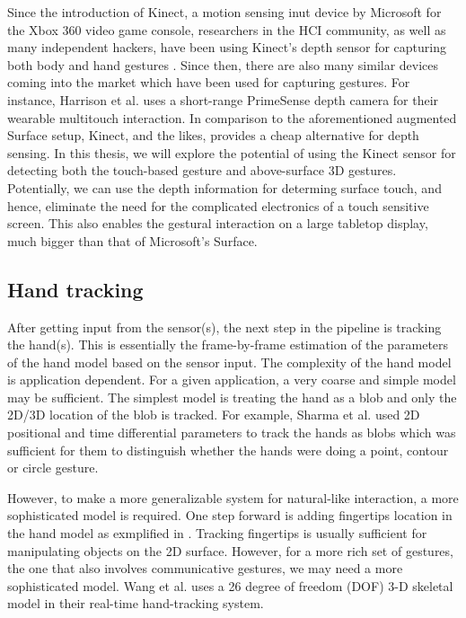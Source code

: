 Since the introduction of Kinect, a motion sensing inut device by Microsoft for
the Xbox 360 video game console, researchers in the HCI community, as well as
many independent hackers, have been using Kinect's depth sensor for capturing
both body and hand gestures \cite{openni}. Since then, there are also many
similar devices coming into the market which have been used for capturing
gestures. For instance, Harrison et al. \cite{harrison11} uses  a short-range
PrimeSense \cite{primesense} depth camera for their wearable multitouch
interaction. In comparison to the aforementioned augmented Surface setup,
Kinect, and the likes, provides a cheap alternative for depth sensing. In this
thesis, we will explore the potential of using the Kinect sensor for detecting 
both the touch-based gesture and above-surface 3D gestures. Potentially, we can 
use the depth information for determing surface touch, and hence, eliminate the 
need for the complicated electronics of a touch sensitive screen. This also 
enables the gestural interaction on a large tabletop display, much bigger than 
that of Microsoft's Surface.

\subsection{Hand tracking}
After getting input from the sensor(s), the next step in the pipeline is
tracking the hand(s). This is essentially the frame-by-frame estimation of the
parameters of the hand model based on the sensor input. The complexity of the
hand model is application dependent. For a given application, a very coarse and
simple model may be sufficient. The simplest model is treating the hand as a
blob and only the 2D/3D location of the blob is tracked. For example, Sharma et
al. \cite{sharma00} used 2D positional and time differential parameters to track
the hands as blobs which was sufficient for them to distinguish whether the
hands were doing a point, contour or circle gesture.

However, to make a more generalizable system for natural-like interaction, a
more sophisticated model is required. One step forward is adding fingertips
location in the hand model as exmplified in \cite{Oka02} \cite{harrison11}
\cite{larson11}. Tracking fingertips is usually sufficient for manipulating
objects on the 2D surface. However, for a more rich set of gestures, the one
that also involves communicative gestures, we may need a more sophisticated
model. Wang et al. \cite{Wang09} uses a 26 degree of freedom (DOF) 3-D skeletal
model in their real-time hand-tracking system. 

